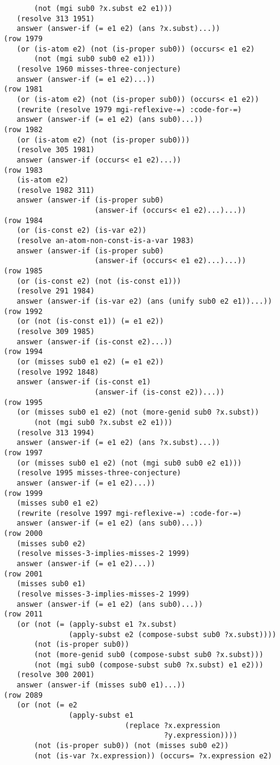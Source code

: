 \documentclass[runningheads]{llncs}
\begin{document}
\begin{verbatim}
       (not (mgi sub0 ?x.subst e2 e1)))
   (resolve 313 1951)
   answer (answer-if (= e1 e2) (ans ?x.subst)...))
(row 1979
   (or (is-atom e2) (not (is-proper sub0)) (occurs< e1 e2)
       (not (mgi sub0 sub0 e2 e1)))
   (resolve 1960 misses-three-conjecture)
   answer (answer-if (= e1 e2)...))
(row 1981
   (or (is-atom e2) (not (is-proper sub0)) (occurs< e1 e2))
   (rewrite (resolve 1979 mgi-reflexive-=) :code-for-=)
   answer (answer-if (= e1 e2) (ans sub0)...))
(row 1982
   (or (is-atom e2) (not (is-proper sub0)))
   (resolve 305 1981)
   answer (answer-if (occurs< e1 e2)...))
(row 1983
   (is-atom e2)
   (resolve 1982 311)
   answer (answer-if (is-proper sub0)
                     (answer-if (occurs< e1 e2)...)...))
(row 1984
   (or (is-const e2) (is-var e2))
   (resolve an-atom-non-const-is-a-var 1983)
   answer (answer-if (is-proper sub0)
                     (answer-if (occurs< e1 e2)...)...))
(row 1985
   (or (is-const e2) (not (is-const e1)))
   (resolve 291 1984)
   answer (answer-if (is-var e2) (ans (unify sub0 e2 e1))...))
(row 1992
   (or (not (is-const e1)) (= e1 e2))
   (resolve 309 1985)
   answer (answer-if (is-const e2)...))
(row 1994
   (or (misses sub0 e1 e2) (= e1 e2))
   (resolve 1992 1848)
   answer (answer-if (is-const e1)
                     (answer-if (is-const e2))...))
(row 1995
   (or (misses sub0 e1 e2) (not (more-genid sub0 ?x.subst))
       (not (mgi sub0 ?x.subst e2 e1)))
   (resolve 313 1994)
   answer (answer-if (= e1 e2) (ans ?x.subst)...))
(row 1997
   (or (misses sub0 e1 e2) (not (mgi sub0 sub0 e2 e1)))
   (resolve 1995 misses-three-conjecture)
   answer (answer-if (= e1 e2)...))
(row 1999
   (misses sub0 e1 e2)
   (rewrite (resolve 1997 mgi-reflexive-=) :code-for-=)
   answer (answer-if (= e1 e2) (ans sub0)...))
(row 2000
   (misses sub0 e2)
   (resolve misses-3-implies-misses-2 1999)
   answer (answer-if (= e1 e2)...))
(row 2001
   (misses sub0 e1)
   (resolve misses-3-implies-misses-2 1999)
   answer (answer-if (= e1 e2) (ans sub0)...))
(row 2011
   (or (not (= (apply-subst e1 ?x.subst)
               (apply-subst e2 (compose-subst sub0 ?x.subst))))
       (not (is-proper sub0))
       (not (more-genid sub0 (compose-subst sub0 ?x.subst)))
       (not (mgi sub0 (compose-subst sub0 ?x.subst) e1 e2)))
   (resolve 300 2001)
   answer (answer-if (misses sub0 e1)...))
(row 2089
   (or (not (= e2
               (apply-subst e1 
                            (replace ?x.expression 
                                     ?y.expression))))
       (not (is-proper sub0)) (not (misses sub0 e2))
       (not (is-var ?x.expression)) (occurs= ?x.expression e2)

\end{verbatim}
\end{document}
